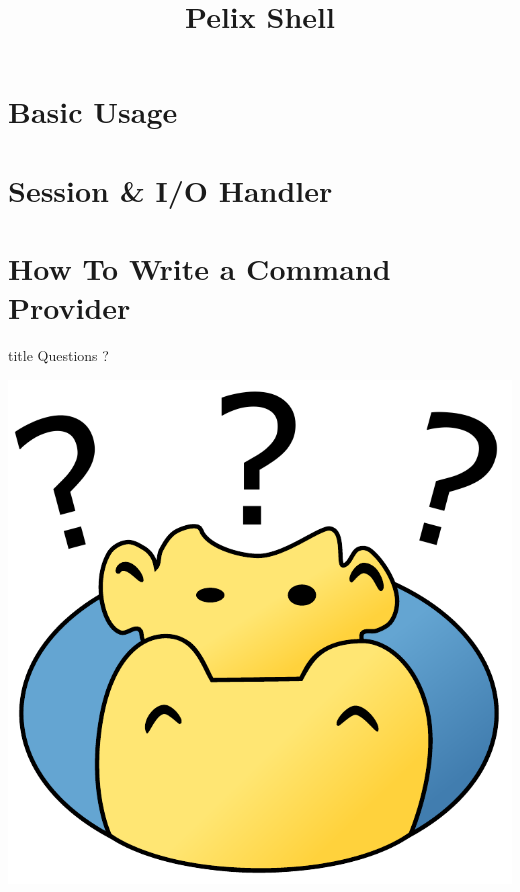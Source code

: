 \documentclass[table]{beamer}
\title[Pelix Shell]{Pelix Shell}
\begin{document}
\frame{\titlepage}

\section{Basic Usage}


\section{Session \& I/O Handler}


\section{How To Write a Command Provider}


\begin{frame}
  \vfill
  \centering
  \begin{beamercolorbox}[sep=8pt,center,shadow=true,rounded=true]{title}
    Questions ?\par%
  \end{beamercolorbox}
  \vspace{3ex}
  \includegraphics[width=.6\textwidth]{../imgs/ipopo_question}
  \vfill
\end{frame}
\end{document}

